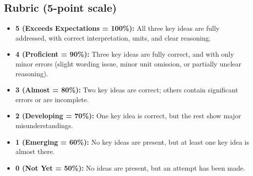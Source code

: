 \documentclass[11pt]{article}
\begin{document}
\subsection*{Rubric (5-point scale)}

\begin{itemize}
    \item \textbf{5 (Exceeds Expectations = 100\%):}  
    All three key ideas are fully addressed, with correct interpretation, units, and clear reasoning.

    \item \textbf{4 (Proficient = 90\%):}  
    Three key ideas are fully correct, and with only minor errors (slight wording issue, minor unit omission, or partially unclear reasoning).

    \item \textbf{3 (Almost = 80\%):}  
    Two key ideas are correct; others contain significant errors or are incomplete.

    \item \textbf{2 (Developing = 70\%):}  
    One key idea is correct, but the rest show major misunderstandings.

    \item \textbf{1 (Emerging = 60\%):}  
    No key ideas are present, but at least one key idea is almost there.

    \item \textbf{0 (Not Yet = 50\%):}  
    No ideas are present, but an attempt has been made.
\end{itemize}
\end{document}
